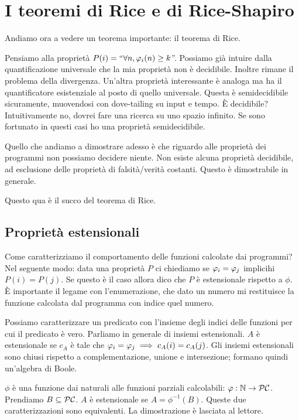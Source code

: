 \chapter{I teoremi di Rice e di Rice-Shapiro}

Andiamo ora a vedere un teorema importante: il teorema di Rice.

Pensiamo alla proprietà $P(i) = ``\forall n, \varphi_{i}(n) \geq k$''. Possiamo già intuire dalla
quantificazione universale che la mia proprietà non è decidibile. Inoltre rimane il problema della
divergenza. Un'altra proprietà interessante è analoga ma ha il quantificatore esistenziale al
posto di quello universale. Questa è semidecidibile sicuramente, muovendosi con dove-tailing su input
e tempo. È decidibile? Intuitivamente no, dovrei fare una ricerca su uno spazio infinito. Se sono
fortunato in questi casi ho una proprietà semidecidibile.

Quello che andiamo a dimostrare adesso è che riguardo alle proprietà dei programmi non possiamo
decidere niente. Non esiste alcuna proprietà decidibile, ad esclusione delle proprietà di
falsità/verità costanti. Questo è dimostrabile in generale.

Questo qua è il succo del teorema di Rice.

\section{Proprietà estensionali}

Come caratterizziamo il comportamento delle funzioni calcolate dai programmi? Nel seguente modo:
data una proprietà $P$ ci chiediamo se $\varphi_{i} = \varphi_{j}$ implicihi $P(i) = P(j)$. Se questo è il
caso allora dico che $P$ è estensionale rispetto a $\phi$. È importante il legame con l'enumerazione,
che dato un numero mi restituisce la funzione calcolata dal programma con indice quel numero.

Possiamo caratterizzare un predicato con l'insieme degli indici delle funzioni per cui il predicato
è vero. Parliamo in generale di insiemi estensionali. $A$ è estensionale se $c_{A}$ è tale
che $\varphi_{i} = \varphi_{j} \implies c_{A}(i) = c_{A}(j)$. Gli insiemi estensionali sono chiusi rispetto a
complementazione, unione e intersezione; formano quindi un'algebra di Boole.

$\phi$ è una funzione dai naturali alle funzioni parziali calcolabili: $\varphi : \mathbb{N} \to \mathcal{PC}$.
Prendiamo $B \subseteq \mathcal{PC}$. $A$ è estensionale se $A = \phi^{-1}(B)$. Queste due caratterizzazioni
sono equivalenti. La dimostrazione è lasciata al lettore.

